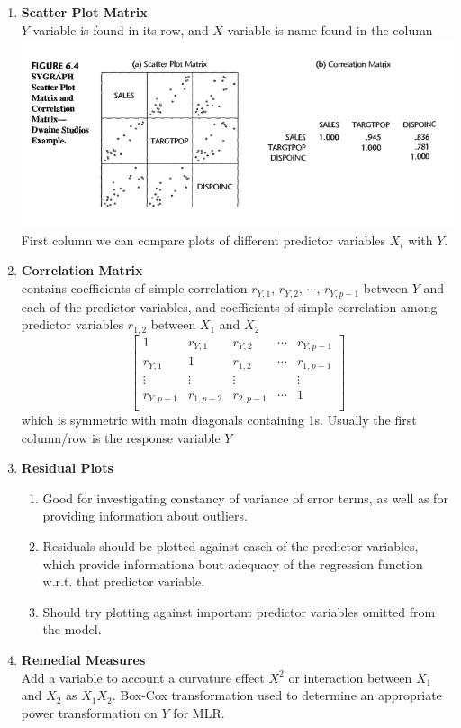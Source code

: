 \documentclass[11pt]{article}
\begin{document}
\begin{enumerate}
    \item \textbf{Scatter Plot Matrix} \\
    $Y$ variable is found in its row, and $X$ variable is name found in the column \\ 
    \includegraphics[width=\textwidth]{scatter_plot_matrix.png} \\
    First column we can compare plots of different predictor variables $X_i$ with $Y$. 
    \item \textbf{Correlation Matrix} \\
    contains coefficients of simple correlation $r_{Y,1}$, $r_{Y,2}$, $\cdots$, $r_{Y,p-1}$ between $Y$ and each of the predictor variables, and coefficients of simple correlation among predictor variables $r_{1,2}$ between $X_1$ and $X_2$
    \[
        \begin{bmatrix}
            1 & r_{Y,1} & r_{Y,2} & \cdots & r_{Y,p-1} \\ 
            r_{Y,1} & 1 & r_{1,2} & \cdots & r_{1,p-1} \\ 
            \vdots & \vdots & \vdots & & \vdots \\
            r_{Y,p-1} & r_{1,p-2} & r_{2,p-1} & \cdots & 1 \\ 
        \end{bmatrix}    
    \]
    which is symmetric with main diagonals containing 1s. Usually the first column/row is the response variable $Y$
    \item \textbf{Residual Plots} \\
    \begin{enumerate}
        \item Good for investigating constancy of variance of error terms, as well as for providing information about outliers.
        \item Residuals should be plotted against easch of the predictor variables, which provide informationa bout adequacy of the regression function w.r.t. that predictor variable.
        \item Should try plotting against important predictor variables omitted from the model.
    \end{enumerate}
    \item \textbf{Remedial Measures} \\
    Add a variable to account a curvature effect $X^2$ or interaction between $X_1$ and $X_2$ as $X_1 X_2$. Box-Cox transformation used to determine an appropriate power transformation on $Y$ for MLR. 
     
\end{enumerate}
\end{document}
